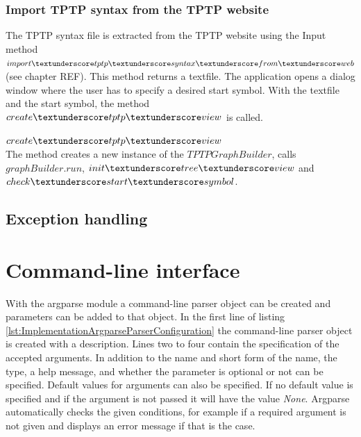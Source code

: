 \subsubsection{Import \ac{TPTP} syntax from the \ac{TPTP} website}\label{sec:ImplementationGUIImportInternet}

The \ac{TPTP} syntax file is extracted from the \ac{TPTP} website using the Input method $import\textunderscore tptp\textunderscore syntax\textunderscore from\textunderscore web$ (see chapter REF). This method returns a textfile. The application opens a dialog window where the user has to specify a desired start symbol. With the textfile and the start symbol, the method $create\textunderscore tptp\textunderscore view$ is called.

$create\textunderscore tptp\textunderscore view$ \\
The method creates a new instance of the $TPTPGraphBuilder$, calls $graphBuilder.run$, $init\textunderscore tree\textunderscore view$ and $check\textunderscore start\textunderscore symbol$.

\subsection{Exception handling}\label{sec:ImplementationGUIExeptionHandling}

\section{Command-line interface}\label{sec:ImplementationCommandLineInterface}
With the argparse module a command-line parser object can be created and parameters can be added to that object.
In the first line of listing \ref{lst:ImplementationArgparseParserConfiguration} the command-line parser object is created with a description.
Lines two to four contain the specification of the accepted arguments.
In addition to the name and short form of the name, the type, a help message, and whether the parameter is optional or not can be specified.
Default values for arguments can also be specified.
If no default value is specified and if the argument is not passed it will have the value \textit{None}.
Argparse automatically checks the given conditions, for example if a required argument is not given and displays an error message if that is the case.

